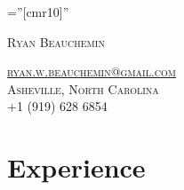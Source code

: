 \documentclass[a4paper, 9pt]{article} %
\begin{document}
\pagestyle{empty} %

\font\fb=''[cmr10]'' %

\vspace{-10pt}
\par{\huge \textsc{Ryan Beauchemin}\par}
\textsc{\href{mailto:ryan.w.beauchemin@gmail.com}{ryan.w.beauchemin@gmail.com}}\\
\textsc{Asheville, North Carolina} \\
+1 (919) 628 6854\\

\vspace{-5pt}
\section{Experience} %
\end{document}
